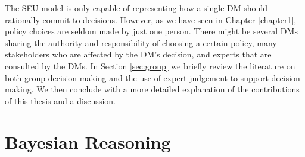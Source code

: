 The SEU model is only capable of representing how a single DM should rationally commit to decisions. However, as we have seen in Chapter \ref{chapter1}, policy choices are seldom made by just one person. There might be several DMs sharing the authority and responsibility of choosing a certain policy, many stakeholders who are affected by the DM's decision, and experts that are consulted by the DMs. In Section \ref{sec:group} we briefly review the literature on both group decision making and the use of expert judgement to support decision making. We then conclude with a more detailed explanation of the contributions of this thesis and a discussion.

\section{Bayesian Reasoning}
\label{sec:bayesianreasoning}
